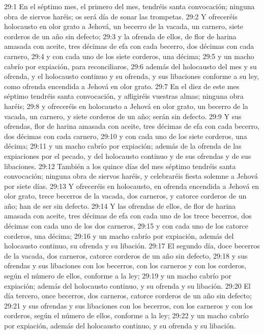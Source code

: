 29:1 En el séptimo mes, el primero del mes, tendréis santa convocación; ninguna obra de siervos haréis; os será día de sonar las trompetas.  
29:2 Y ofreceréis holocausto en olor grato a Jehová, un becerro de la vacada, un carnero, siete corderos de un año sin defecto;  
29:3 y la ofrenda de ellos, de flor de harina amasada con aceite, tres décimas de efa   con cada becerro, dos décimas con cada carnero,  
29:4 y con cada uno de los siete corderos, una décima;  
29:5 y un macho cabrío por expiación, para reconciliaros,  
29:6 además del holocausto del mes y su ofrenda, y el holocausto continuo y su ofrenda, y sus libaciones conforme a su ley, como ofrenda encendida a Jehová en olor grato.  
29:7 En el diez de este mes séptimo tendréis santa convocación, y afligiréis vuestras almas; ninguna obra haréis;  
29:8 y ofreceréis en holocausto a Jehová en olor grato, un becerro de la vacada, un carnero, y siete corderos de un año; serán sin defecto.  
29:9 Y sus ofrendas, flor de harina amasada con aceite, tres décimas de efa   con cada becerro, dos décimas con cada carnero,  
29:10 y con cada uno de los siete corderos, una décima;  
29:11 y un macho cabrío por expiación; además de la ofrenda de las expiaciones por el pecado, y del holocausto continuo y de sus ofrendas y de sus libaciones.  
29:12 También a los quince días del mes séptimo tendréis santa convocación; ninguna obra de siervos haréis, y celebraréis fiesta solemne a Jehová por siete días. 
29:13 Y ofreceréis en holocausto, en ofrenda encendida a Jehová en olor grato, trece becerros de la vacada, dos carneros, y catorce corderos de un año; han de ser sin defecto.  
29:14 Y las ofrendas de ellos, de flor de harina amasada con aceite, tres décimas de efa   con cada uno de los trece becerros, dos décimas con cada uno de los dos carneros,  
29:15 y con cada uno de los catorce corderos, una décima;  
29:16 y un macho cabrío por expiación, además del holocausto continuo, su ofrenda y su libación.  
29:17 El segundo día, doce becerros de la vacada, dos carneros, catorce corderos de un año sin defecto,  
29:18 y sus ofrendas y sus libaciones con los becerros, con los carneros y con los corderos, según el número de ellos, conforme a la ley;  
29:19 y un macho cabrío por expiación; además del holocausto continuo, y su ofrenda y su libación.  
29:20 El día tercero, once becerros, dos carneros, catorce corderos de un año sin defecto;  
29:21 y sus ofrendas y sus libaciones con los becerros, con los carneros y con los corderos, según el número de ellos, conforme a la ley;  
29:22 y un macho cabrío por expiación, además del holocausto continuo, y su ofrenda y su libación.  
